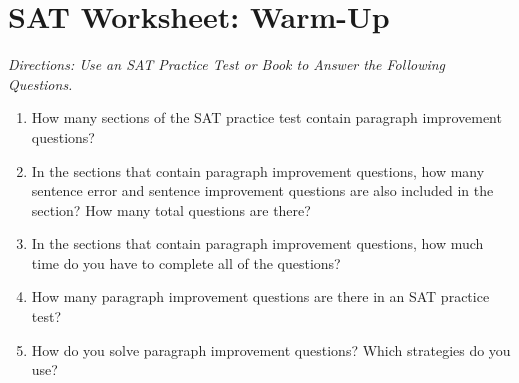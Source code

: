 \section{SAT Worksheet: Warm-Up}

\textit{Directions: Use an SAT Practice Test or Book to Answer the Following Questions.}

\begin{enumerate}
\item How many sections of the SAT practice test contain paragraph improvement questions? \hrulefill

\item In the sections that contain paragraph improvement questions, how many sentence error and sentence improvement questions are also included in the section? How many total questions are there? \hrulefill

\item In the sections that contain paragraph improvement questions, how much time do you have to complete all of the questions? \hrulefill

\item How many paragraph improvement questions are there in an SAT practice test? \hrulefill

\item How do you solve paragraph improvement questions? Which strategies do you use? \hrulefill

\end{enumerate}
